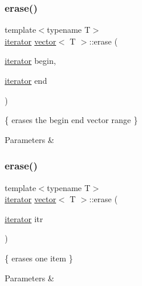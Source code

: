 \subsubsection{\texorpdfstring{erase()}{erase()}\hspace{0.1cm}{\footnotesize\ttfamily [1/2]}}
{\footnotesize\ttfamily template$<$typename T$>$ \\
\hyperlink{classMyIterator}{iterator} \hyperlink{classvector}{vector}$<$ T $>$\+::erase (\begin{DoxyParamCaption}\item[{\hyperlink{classMyIterator}{iterator}}]{begin,  }\item[{\hyperlink{classMyIterator}{iterator}}]{end }\end{DoxyParamCaption})\hspace{0.3cm}{\ttfamily [inline]}}



\{ erases the begin end vector range \} 


\begin{DoxyParams}{Parameters}
{\em } & \\
\hline
\end{DoxyParams}
\mbox{\label{classvector_a33d4637bc1990495dc54171e36853d1b}} 
\subsubsection{\texorpdfstring{erase()}{erase()}\hspace{0.1cm}{\footnotesize\ttfamily [2/2]}}
{\footnotesize\ttfamily template$<$typename T$>$ \\
\hyperlink{classMyIterator}{iterator} \hyperlink{classvector}{vector}$<$ T $>$\+::erase (\begin{DoxyParamCaption}\item[{\hyperlink{classMyIterator}{iterator}}]{itr }\end{DoxyParamCaption})\hspace{0.3cm}{\ttfamily [inline]}}



\{ erases one item \} 


\begin{DoxyParams}{Parameters}
{\em } & \\
\hline
\end{DoxyParams}
\mbox{\label{classvector_a0eaefdda2a1e218edfc73fc259d51705}} 
